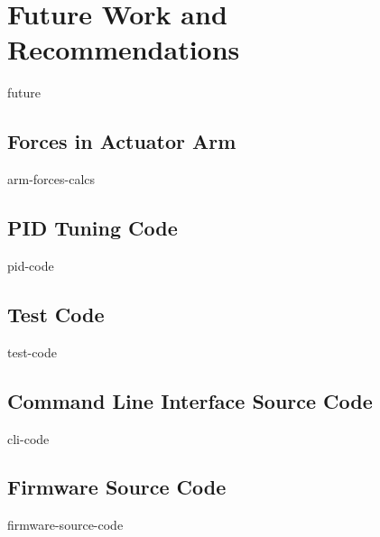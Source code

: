 \documentclass[a4paper,12pt,oneside]{book}
\begin{document}
\chapter{Future Work and Recommendations}
{future}

\printbibliography[
    heading=bibintoc,
    title={Bibliography}]



\begin{appendices}
    \renewcommand{\thechapter}{}
    \renewcommand{\thesection}{\Alph{section}}

    \section{Forces in Actuator Arm}\label{apx:arm-calcs}
    {arm-forces-calcs}

    \section{PID Tuning Code}\label{apx:pid-code}
    {pid-code}

    \section{Test Code}\label{apx:test-code}
    {test-code}

    \section{Command Line Interface Source Code}\label{apx:cli-code}
    {cli-code}

    \section{Firmware Source Code}\label{apx:firmware-code}
    {firmware-source-code}    
\end{appendices}
\end{document}
